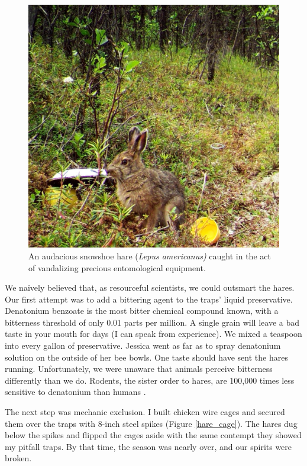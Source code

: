 \begin{figure}[H]
\begin{center}
\vspace{2mm}
\includegraphics[width=\textwidth]{img/hare.jpg}
\caption{An audacious snowshoe hare (\textit{Lepus americanus)} caught in the act of vandalizing precious entomological equipment.}
\label{hare}
\end{center}
\end{figure}  

We na\"{i}vely believed that, as resourceful scientists, we could outsmart the hares. Our first attempt was to add a bittering agent to the traps’ liquid preservative. Denatonium benzoate is the most bitter chemical compound known, with a bitterness threshold of only 0.01 parts per million. A single grain will leave a bad taste in your mouth for days (I can speak from experience). We mixed a teaspoon into every gallon of preservative. Jessica went as far as to spray denatonium solution on the outside of her bee bowls. One taste should have sent the hares running. Unfortunately, we were unaware that animals perceive bitterness differently than we do. Rodents, the sister order to hares, are 100,000 times less sensitive to denatonium than humans \citep{Franketal2004}. 

The next step was mechanic exclusion. I built chicken wire cages and secured them over the traps with 8-inch steel spikes (Figure \ref{hare_cage}). The hares dug below the spikes and flipped the cages aside with the same contempt they showed my pitfall traps. By that time, the season was nearly over, and our spirits were broken.

